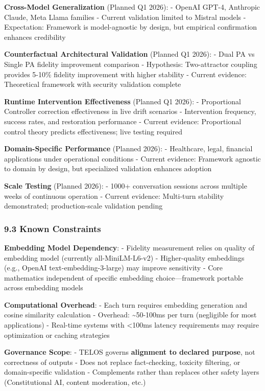 \textbf{Cross-Model Generalization} (Planned Q1 2026): - OpenAI GPT-4,
Anthropic Claude, Meta Llama families - Current validation limited to
Mistral models - Expectation: Framework is model-agnostic by design, but
empirical confirmation enhances credibility

\textbf{Counterfactual Architectural Validation} (Planned Q1 2026): -
Dual PA vs Single PA fidelity improvement comparison - Hypothesis:
Two-attractor coupling provides 5-10\% fidelity improvement with higher
stability - Current evidence: Theoretical framework with security
validation complete

\textbf{Runtime Intervention Effectiveness} (Planned Q1 2026): -
Proportional Controller correction effectiveness in live drift scenarios
- Intervention frequency, success rates, and restoration performance -
Current evidence: Proportional control theory predicts effectiveness;
live testing required

\textbf{Domain-Specific Performance} (Planned 2026): - Healthcare,
legal, financial applications under operational conditions - Current
evidence: Framework agnostic to domain by design, but specialized
validation enhances adoption

\textbf{Scale Testing} (Planned 2026): - 1000+ conversation sessions
across multiple weeks of continuous operation - Current evidence:
Multi-turn stability demonstrated; production-scale validation pending

\subsubsection{9.3 Known Constraints}\label{known-constraints}

\textbf{Embedding Model Dependency}: - Fidelity measurement relies on
quality of embedding model (currently all-MiniLM-L6-v2) - Higher-quality
embeddings (e.g., OpenAI text-embedding-3-large) may improve sensitivity
- Core mathematics independent of specific embedding choice---framework
portable across embedding models

\textbf{Computational Overhead}: - Each turn requires embedding
generation and cosine similarity calculation - Overhead:
\textasciitilde50-100ms per turn (negligible for most applications) -
Real-time systems with \textless100ms latency requirements may require
optimization or caching strategies

\textbf{Governance Scope}: - TELOS governs \textbf{alignment to declared
purpose}, not correctness of outputs - Does not replace fact-checking,
toxicity filtering, or domain-specific validation - Complements rather
than replaces other safety layers (Constitutional AI, content
moderation, etc.)

